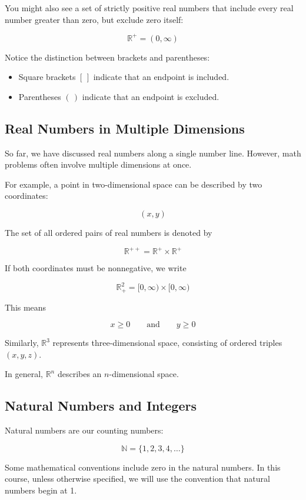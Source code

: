 \documentclass[12pt]{article}
\begin{document}
You might also see a set of strictly positive real numbers that include every real number greater than zero, but exclude zero itself:

\[
\mathbb{R}^+=(0,\infty)
\]

Notice the distinction between brackets and parentheses:

\begin{itemize}
    \item Square brackets $[\,]$ indicate that an endpoint is included.
    \item Parentheses $(\,)$ indicate that an endpoint is excluded.
\end{itemize}

\subsection{Real Numbers in Multiple Dimensions}

So far, we have discussed real numbers along a single number line. However, math problems often involve multiple dimensions at once.

For example, a point in two-dimensional space can be described by two coordinates:

\[
(x,y)
\]

The set of all ordered pairs of real numbers is denoted by

\[
\mathbb{R}^{++}=\mathbb{R}^+\times\mathbb{R}^+
\]

If both coordinates must be nonnegative, we write

\[
\mathbb{R}_{+}^2
=
[0,\infty)\times[0,\infty)
\]

This means

\[
x\geq 0
\qquad \text{and} \qquad
y\geq 0
\]

Similarly, $\mathbb{R}^3$ represents three-dimensional space, consisting of ordered triples $(x,y,z)$.

In general, $\mathbb{R}^n$ describes an $n$-dimensional space.

\subsection{Natural Numbers and Integers}

Natural numbers are our counting numbers:

\[
\mathbb{N}=\{1,2,3,4,\ldots\}
\]

Some mathematical conventions include zero in the natural numbers. In this course, unless otherwise specified, we will use the convention that natural numbers begin at 1.
\end{document}
